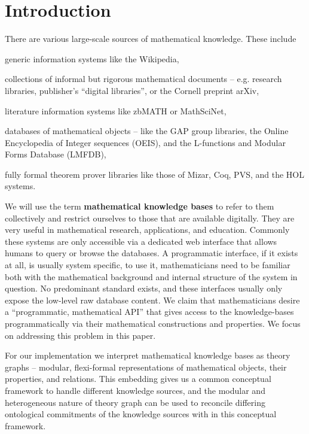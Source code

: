 \section{Introduction}\label{sec:intro}

There are various large-scale sources of mathematical knowledge.  These include
\begin{compactitem}
\item generic information systems like the Wikipedia,
\item collections of informal but rigorous mathematical documents -- e.g. research libraries, publisher's ``digital libraries'', or the Cornell preprint arXiv,
\item literature information systems like zbMATH or MathSciNet,
\item databases of mathematical objects -- like the GAP group libraries, the Online Encyclopedia of Integer sequences (OEIS), and the L-functions and Modular Forms Database (LMFDB),
\item fully formal theorem prover libraries like those of Mizar, Coq, PVS, and the HOL systems.
\end{compactitem}
  
We will use the term \textbf{mathematical knowledge bases} to refer to them collectively and restrict ourselves to those that are available digitally.
They are very useful in mathematical research, applications, and education.  
Commonly these systems are only accessible via a dedicated web interface that allows humans to query or browse the databases. 
A programmatic interface, if it exists at all, is usually system specific, to use it, mathematicians need to be familiar both with the mathematical background and internal structure of the system in question.  
No predominant standard exists, and these interfaces usually only expose the low-level raw database content.
We claim that mathematicians desire a ``programmatic, mathematical API'' that gives access to the knowledge-bases programmatically via their mathematical constructions and properties. 
We focus on addressing this problem in this paper. 

For our implementation we interpret mathematical knowledge bases as \ommt theory graphs -- modular, flexi-formal representations of mathematical objects, their properties, and relations. 
This embedding gives us a common conceptual framework to handle different knowledge sources, and the modular and heterogeneous nature of \ommt theory graph can be used to reconcile differing ontological commitments of the knowledge sources with in this conceptual framework.

